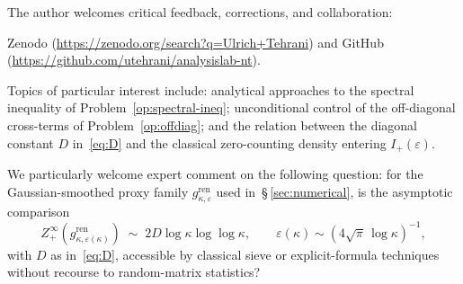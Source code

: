 \documentclass[11pt]{article}
\begin{document}
The author welcomes critical feedback, corrections, and
collaboration:
{\sloppy
Zenodo (\url{https://zenodo.org/search?q=Ulrich+Tehrani}) and
GitHub (\url{https://github.com/utehrani/analysislab-nt}).
\par}

Topics of particular interest include: analytical approaches to
the spectral inequality of Problem~\ref{op:spectral-ineq};
unconditional control of the off-diagonal cross-terms of
Problem~\ref{op:offdiag}; and the relation between the diagonal
constant $D$ in~\eqref{eq:D} and the classical zero-counting
density entering $I_+(\varepsilon)$.

We particularly welcome expert comment on the following
question: for the Gaussian-smoothed proxy family
$g^{\mathrm{ren}}_{\kappa,\varepsilon}$ used
in~\S\,\ref{sec:numerical},
is the asymptotic comparison
\[
Z_+^{\infty}(g^{\mathrm{ren}}_{\kappa,\varepsilon(\kappa)})
\;\sim\; 2D\log\kappa\log\log\kappa,
\qquad
\varepsilon(\kappa)\sim (4\sqrt\pi\,\log\kappa)^{-1},
\]
with $D$ as in~\eqref{eq:D}, accessible by classical sieve or
explicit-formula techniques without recourse to random-matrix
statistics?
\end{document}

